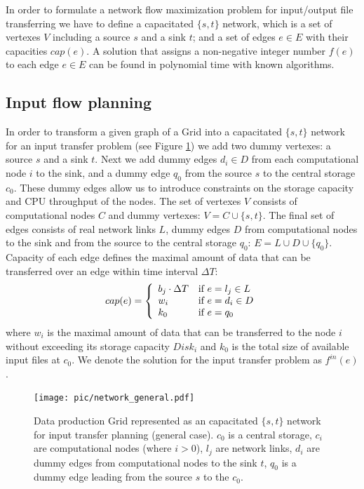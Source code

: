 \documentclass{svjour3}                     %
\begin{document}
In order to formulate a network flow maximization problem \cite{Network_flows}
for input/output file transferring we have to define a capacitated $\{s,t\}$
network, which is a set of vertexes $V$ including a source $s$ and a sink $t$;
and a set of edges $e\in E$ with their capacities $cap(e)$. A solution that
assigns a non-negative integer number $f(e)$ to each edge $e \in E$ can be
found in polynomial time with known algorithms.

\subsection{Input flow planning}

In order to transform a given graph of a Grid into a capacitated $\{s,t\}$
network for an input transfer problem (see Figure \ref{network_general}) we add two dummy vertexes: a source $s$
and a sink $t$. Next we add  dummy edges $d_{i} \in D$ from each computational
node $i$ to the sink, and a dummy edge $q_{0}$ from the source $s$ to the
central storage $c_{0}$. These dummy edges allow us to introduce constraints
on the storage capacity and CPU throughput of the nodes. The set of vertexes $V$ consists of
computational nodes $C$ and dummy vertexes: $V= C \cup \{s,t\}$. The final set
of edges consists of real network links $L$, dummy edges $D$ from
computational nodes to the sink and from the source to the central storage
$q_{0}$: $E= L \cup D \cup \{q_{0}\}$. Capacity of each edge defines the
maximal amount of data that can be transferred over an edge within time
interval $\Delta T$: 
%
\begin{equation} 
\label{edge_cap} 
cap(e) = \left\{
\begin{array}{l l} 
b_{j} \cdot \Delta T & \text{if }e = l_{j} \in L \\ w_{i} &
\text{if } e = d_{i} \in D\\ k_{0} & \text{if } e = q_{0} 
\end{array} \right.
\end{equation} 
%
where $w_{i}$ is the maximal amount of data that can be
transferred to the node $i$ without exceeding its storage capacity $Disk_{i}$
and $k_{0}$ is the total size of available input files at $c_{0}$. We denote
the solution for the input transfer problem as $f^{in}(e)$.
\begin{figure}
	\begin{center}
		\texttt{[image: pic/network\_general.pdf]}
	\end{center}
	\caption{Data production Grid represented as an capacitated $\{s,t\}$ network for input transfer planning (general case). $c_{0}$ is a central storage, $c_{i}$ are computational nodes (where $i>0$), $l_{j}$ are network links, $d_{i}$ are dummy edges from computational nodes to the sink $t$, $q_{0}$ is a dummy edge leading from the source $s$ to the $c_{0}$. }
	\label{network_general}
\end{figure}  
\end{document}
